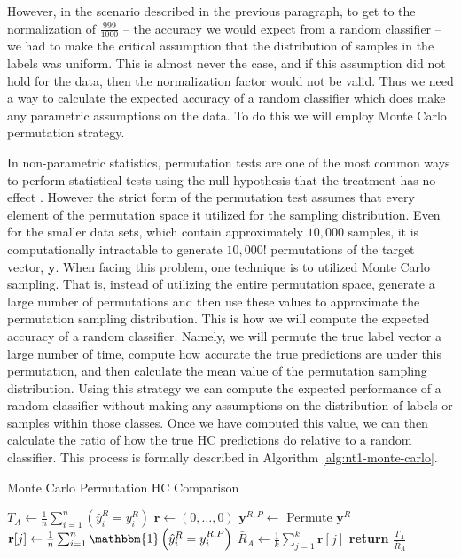 \documentclass[../thesis.tex]{subfiles}
\begin{document}
However, in the scenario described in the previous paragraph, to get to the
normalization of $\frac{999}{1000}$ -- the accuracy we would expect from a
random classifier -- we had to make the critical assumption that the
distribution of samples in the labels was uniform. This is almost never the
case, and if this assumption did not hold for the data, then the normalization
factor would not be valid. Thus we need a way to calculate the expected accuracy
of a random classifier which does make any parametric assumptions on the data.
To do this we will employ Monte Carlo permutation strategy.

In non-parametric statistics, permutation tests are one of the most common ways
to perform statistical tests using the null hypothesis that the treatment has no
effect \cite{good2013permutation}. However the strict form of the permutation
test assumes that every element of the permutation space it utilized for the
sampling distribution. Even for the smaller data sets, which contain
approximately $10,000$ samples, it is computationally intractable to generate
$10,000!$ permutations of the target vector, $\mathbf{y}$. When facing this
problem, one technique is to utilized Monte Carlo sampling. That is, instead of
utilizing the entire permutation space, generate a large number of permutations
and then use these values to approximate the permutation sampling distribution.
This is how we will compute the expected accuracy of a random classifier.
Namely, we will permute the true label vector a large number of time, compute
how accurate the true predictions are under this permutation, and then calculate
the mean value of the permutation sampling distribution. Using this strategy we
can compute the expected performance of a random classifier without making any
assumptions on the distribution of labels or samples within those classes. Once
we have computed this value, we can then calculate the ratio of how the true HC
predictions do relative to a random classifier. This process is formally
described in Algorithm \ref{alg:nt1-monte-carlo}.
\begin{algorithm}
    \caption{Monte Carlo Permutation HC Comparison}
    \label{alg:nt1-monte-carlo}
    \begin{algorithmic}[1]
            \State $T_A \gets \frac{1}{n} \sum_{i=1}^n \left(\hat{y}_i^R = y_i^R
            \right)$
            \State $\mathbf{r} \gets (0, \ldots, 0)$ 
                \State $\mathbf{y}^{R, P} \gets $ Permute $\mathbf{y}^R$
                \State $\mathbf{r}[j] \gets \frac{1}{n} \sum_{i=1}^n
                \mathbbm{1}\left(\hat{y}_i^R = y_i^{R,P}\right)$
            \EndFor
            \State $\bar{R}_A \gets \frac{1}{k} \sum_{j=1}^k \mathbf{r}[j]$
            \State \textbf{return} $\frac{T_A}{\bar{R}_A}$
        \EndProcedure
    \end{algorithmic}
\end{algorithm}
\end{document}
